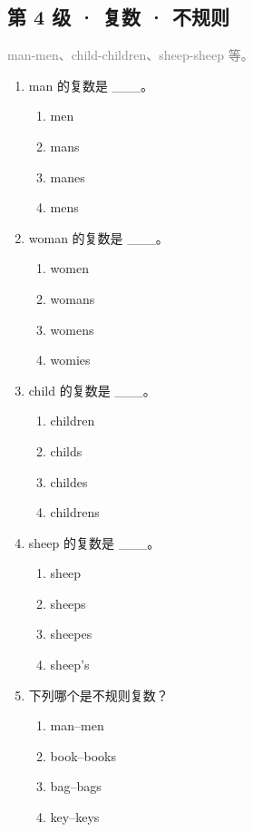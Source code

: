 \documentclass[11pt,a4paper]{ctexart}
\begin{document}
\subsection*{第 4 级 · 复数 · 不规则}
\noindent\textcolor{gray}{man-men、child-children、sheep-sheep 等。}\par\smallskip
\begin{enumerate}[leftmargin=*,itemsep=4pt]
\item man 的复数是 \_\_\_。
\begin{enumerate}[label=\Alph*.,leftmargin=2em,itemsep=1pt,topsep=2pt]
\item men
\item mans
\item manes
\item mens
\end{enumerate}
\item woman 的复数是 \_\_\_。
\begin{enumerate}[label=\Alph*.,leftmargin=2em,itemsep=1pt,topsep=2pt]
\item women
\item womans
\item womens
\item womies
\end{enumerate}
\item child 的复数是 \_\_\_。
\begin{enumerate}[label=\Alph*.,leftmargin=2em,itemsep=1pt,topsep=2pt]
\item children
\item childs
\item childes
\item childrens
\end{enumerate}
\item sheep 的复数是 \_\_\_。
\begin{enumerate}[label=\Alph*.,leftmargin=2em,itemsep=1pt,topsep=2pt]
\item sheep
\item sheeps
\item sheepes
\item sheep’s
\end{enumerate}
\item 下列哪个是不规则复数？
\begin{enumerate}[label=\Alph*.,leftmargin=2em,itemsep=1pt,topsep=2pt]
\item man–men
\item book–books
\item bag–bags
\item key–keys
\end{enumerate}

\end{enumerate}
\end{document}
